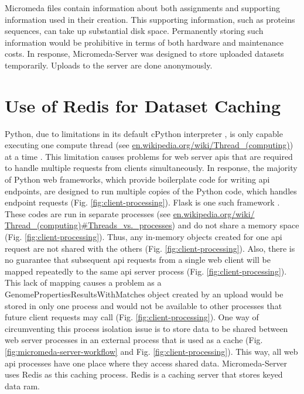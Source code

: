 Micromeda files contain information about both assignments and supporting information used in their creation. This supporting information, such as proteins sequences, can take up substantial disk space. Permanently storing such information would be prohibitive in terms of both hardware and maintenance costs. In response, Micromeda-Server was designed to store uploaded datasets temporarily. Uploads to the server are done anonymously. 

\section{Use of Redis for Dataset Caching} \label{redis-caching}

Python, due to limitations in its default cPython interpreter \cite{van1995python}, is only capable executing one compute thread \cite{saltzer1966traffic} (see \href{http://en.wikipedia.org/wiki/Thread_(computing)}{en.wikipedia.org/wiki/Thread\_(computing)}) at a time \cite{beazley2010understanding}. This limitation causes problems for web server \gls{api}s that are required to handle multiple requests from clients simultaneously. In response, the majority of Python web frameworks, which provide boilerplate code for writing \gls{api} endpoints, are designed to run multiple copies of the Python code, which handles endpoint requests (Fig. \ref{fig:client-processing}). Flask is one such framework \cite{grinberg2018flask}. These codes are run in separate processes (see \href{http://en.wikipedia.org/wiki/Thread_(computing)\#Threads\_vs.\_processes}{en.wikipedia.org/wiki/ Thread\_(computing)\#Threads\_vs.\_processes}) and do not share a memory space (Fig. \ref{fig:client-processing}). Thus, any in-memory objects created for one \gls{api} request are not shared with the others (Fig. \ref{fig:client-processing}). Also, there is no guarantee that subsequent \gls{api} requests from a single web client will be mapped repeatedly to the same \gls{api} server process (Fig. \ref{fig:client-processing}). This lack of mapping causes a problem as a GenomePropertiesResultsWithMatches object created by an upload would be stored in only one process and would not be available to other processes that future client requests may call (Fig. \ref{fig:client-processing}). One way of circumventing this process isolation issue is to store data to be shared between web server processes in an external process that is used as a cache (Fig. \ref{fig:micromeda-server-workflow} and Fig. \ref{fig:client-processing}). This way, all web \gls{api} processes have one place where they access shared data. Micromeda-Server uses Redis as this caching process. Redis is a caching server that stores keyed data \gls{ram}. 

